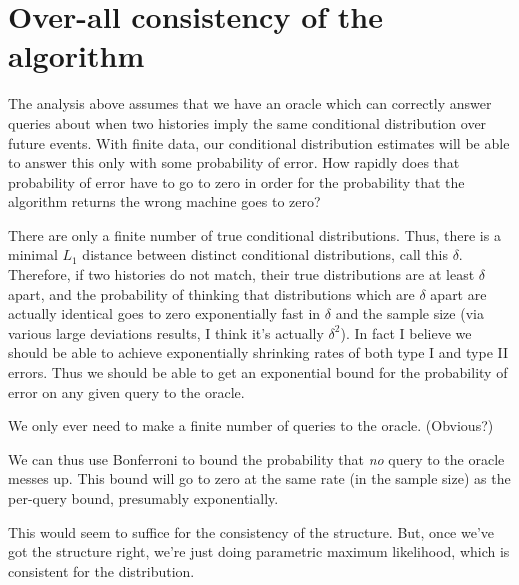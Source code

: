 \documentclass[../new-procedure.tex]{subfiles}
\begin{document}
\section{Over-all consistency of the algorithm}

The analysis above assumes that we have an oracle which can correctly answer
queries about when two histories imply the same conditional distribution over
future events.  With finite data, our conditional distribution estimates will
be able to answer this only with some probability of error.  How rapidly does
that probability of error have to go to zero in order for the probability that
the algorithm returns the wrong machine goes to zero?

There are only a finite number of true conditional distributions.  Thus, there
is a minimal $L_1$ distance between distinct conditional distributions, call
this $\delta$.  Therefore, if two histories do not match, their true
distributions are at least $\delta$ apart, and the probability of thinking that
distributions which are $\delta$ apart are actually identical goes to zero
exponentially fast in $\delta$ and the sample size (via various large
deviations results, I think it's actually $\delta^2$).  In fact I believe we
should be able to achieve exponentially shrinking rates of both type I and type
II errors.  Thus we should be able to get an exponential bound for the
probability of error on any given query to the oracle.

We only ever need to make a finite number of queries to the oracle.  (Obvious?)

We can thus use Bonferroni to bound the probability that {\em no} query to the
oracle messes up.  This bound will go to zero at the same rate (in the sample
size) as the per-query bound, presumably exponentially.

This would seem to suffice for the consistency of the structure.  But, once
we've got the structure right, we're just doing parametric maximum likelihood,
which is consistent for the distribution.
\end{document}
